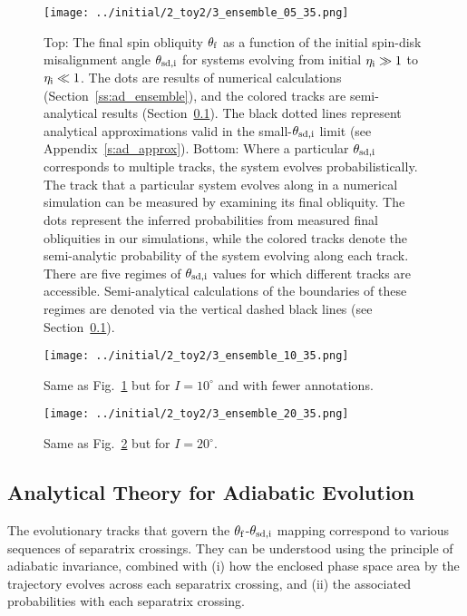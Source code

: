 \documentclass[
        fleqn,
        usenatbib,
        referee,
    ]{mnras}
\begin{document}
\begin{figure}
    \centering
    \texttt{[image: ../initial/2\_toy2/3\_ensemble\_05\_35.png]}
    \caption{Top: The final spin obliquity $\theta_{\rm f}$ as a function of the
    initial spin-disk misalignment angle $\theta_{\rm sd, i}$ for systems
    evolving from initial $\eta_{\rm i} \gg 1$ to $\eta_{\rm i} \ll 1$. The dots
    are results of numerical calculations (Section~\ref{ss:ad_ensemble}), and
    the colored tracks are semi-analytical results
    (Section~\ref{ss:zone_transitions}). The black dotted lines represent
    analytical approximations valid in the small-$\theta_{\rm sd, i}$ limit (see
    Appendix~\ref{s:ad_approx}). Bottom: Where a particular $\theta_{\rm sd, i}$
    corresponds to multiple tracks, the system evolves probabilistically.
    The track that a particular system evolves along in a numerical simulation
    can be measured by examining its final obliquity. The dots represent the
    inferred probabilities from measured final obliquities in our simulations,
    while the colored tracks denote the semi-analytic probability of the system
    evolving along each track. There are five regimes of $\theta_{\rm sd, i}$
    values for which different tracks are accessible. Semi-analytical
    calculations of the boundaries of these regimes are denoted via the vertical
    dashed black lines (see
    Section~\ref{ss:zone_transitions}).}\label{fig:ad_ensemble}
\end{figure}
\begin{figure}
    \centering
    \texttt{[image: ../initial/2\_toy2/3\_ensemble\_10\_35.png]}
    \caption{Same as Fig.~\ref{fig:ad_ensemble} but for $I =
    10^\circ$ and with fewer annotations.}\label{fig:3_ensemble_10_35}
\end{figure}
\begin{figure}
    \centering
    \texttt{[image: ../initial/2\_toy2/3\_ensemble\_20\_35.png]}
    \caption{Same as Fig.~\ref{fig:3_ensemble_10_35} but for $I = 20^\circ$.
    }\label{fig:3_ensemble_20_35}
\end{figure}

\subsection{Analytical Theory for Adiabatic Evolution}\label{ss:zone_transitions}

The evolutionary tracks that govern the $\theta_{\rm f}$-$\theta_{\rm sd, i}$
mapping correspond to various sequences of separatrix crossings. They can be
understood using the principle of adiabatic invariance, combined with (i) how
the enclosed phase space area by the trajectory evolves across each separatrix
crossing, and (ii) the associated probabilities with each separatrix crossing.
\end{document}
